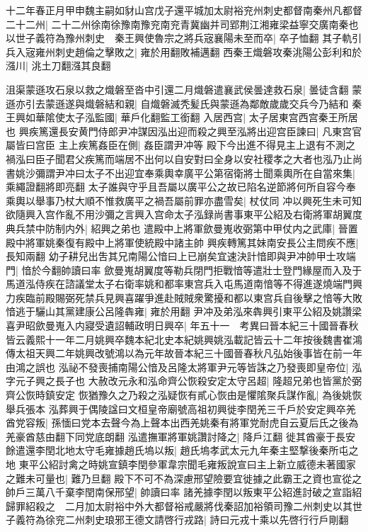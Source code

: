 十二年春正月甲申魏主嗣如豺山宫戊子還平城加太尉裕兖州刺史都督南秦州凡都督二十二州|{
	二十二州徐南徐豫南豫兖南兖青冀幽并司郢荆江湘雍梁益寧交廣南秦也}
以世子義符為豫州刺史　秦王興使魯宗之將兵宼襄陽未至而卒|{
	卒子恤翻}
其子軌引兵入宼雍州刺史趙倫之擊敗之|{
	雍於用翻敗補邁翻}
西秦王熾磐攻秦洮陽公彭利和於漒川|{
	洮土刀翻漒其良翻}


沮渠蒙遜攻石泉以救之熾磐至沓中引還二月熾磐遣襄武侯曇達救石泉|{
	曇徒含翻}
蒙遜亦引去蒙遜遂與熾磐結和親|{
	自熾磐滅秃髪氏與蒙遜為鄰敵歲歲交兵今乃結和}
秦王興如華隂使太子泓監國|{
	華戶化翻監工銜翻}
入居西宫|{
	太子居東宫西宫秦王所居也}
興疾篤還長安黄門侍郎尹冲謀因泓出迎而殺之興至泓將出迎宫臣諫曰|{
	凡東宫官屬皆曰宫臣}
主上疾篤姦臣在側|{
	姦臣謂尹冲等}
殿下今出進不得見主上退有不測之禍泓曰臣子聞君父疾篤而端居不出何以自安對曰全身以安社稷孝之大者也泓乃止尚書姚沙彌謂尹冲曰太子不出迎宜奉乘輿幸廣平公第宿衛將士聞乘輿所在自當來集|{
	乘繩證翻將即亮翻}
太子誰與守乎且吾屬以廣平公之故已陷名逆節將何所自容今奉乘輿以舉事乃杖大順不惟救廣平之禍吾屬前罪亦盡雪矣|{
	杖仗同}
冲以興死生未可知欲隨興入宫作亂不用沙彌之言興入宫命太子泓録尚書事東平公紹及右衛將軍胡翼度典兵禁中防制内外|{
	紹興之弟也}
遣殿中上將軍歛曼嵬收弼第中甲仗内之武庫|{
	晉置殿中將軍姚秦復有殿中上將軍使統殿中諸主帥}
興疾轉篤其妹南安長公主問疾不應|{
	長知兩翻}
幼子耕兒出吿其兄南陽公愔曰上已崩矣宜速決計愔即與尹冲帥甲士攻端門|{
	愔於今翻帥讀曰率}
歛曼嵬胡翼度等勒兵閉門拒戰愔等遣壯士登門緣屋而入及于馬道泓侍疾在諮議堂太子右衛率姚和都率東宫兵入屯馬道南愔等不得進遂燒端門興力疾臨前殿賜弼死禁兵見興喜躍爭進赴賊賊衆驚擾和都以東宫兵自後擊之愔等大敗愔逃于驪山其黨建康公呂隆犇雍|{
	雍於用翻}
尹冲及弟泓來犇興引東平公紹及姚讚梁喜尹昭歛曼嵬入内寢受遺詔輔政明日興卒|{
	年五十一　考異曰晉本紀三十國晉春秋皆云義熙十一年二月姚興卒魏本紀北史本紀姚興姚泓載記皆云十二年按後魏書崔鴻傳太祖天興二年姚興改號鴻以為元年故晉本紀三十國晉春秋凡弘始後事皆在前一年由鴻之誤也}
泓祕不發喪捕南陽公愔及呂隆太將軍尹元等皆誅之乃發喪即皇帝位|{
	泓字元子興之長子也}
大赦改元永和泓命齊公恢殺安定太守呂超|{
	隆超兄弟也皆黨於弼齊公恢時鎮安定}
恢猶豫久之乃殺之泓疑恢有貳心恢由是懼隂聚兵謀作亂|{
	為後姚恢舉兵張本}
泓葬興于偶陵諡曰文桓皇帝廟號高祖初興徙李閏羌三千戶於安定興卒羌酋党容叛|{
	孫愐曰党本去聲今為上聲本出西羌姚秦有將軍党耐虎自云夏后氏之後為羌豪酋慈由翻下同党底朗翻}
泓遣撫軍將軍姚讚討降之|{
	降戶江翻}
徙其酋豪于長安餘遣還李閏北地太守毛雍據趙氏塢以叛|{
	趙氏塢孝武太元九年秦主堅撃後秦所屯之地}
東平公紹討禽之時姚宣鎮李閏參軍韋宗聞毛雍叛說宣曰主上新立威德未著國家之難未可量也|{
	難乃旦翻}
殿下不可不為深慮邢望險要宜徙據之此霸王之資也宣從之帥戶三萬八千棄李閏南保邢望|{
	帥讀曰率}
諸羌據李閏以叛東平公紹進討破之宣詣紹歸罪紹殺之　二月加太尉裕中外大都督裕戒嚴將伐秦詔加裕領司豫二州刺史以其世子義符為徐兖二州刺史琅邪王德文請啓行戎路|{
	詩曰元戎十乘以先啓行行戶剛翻}

